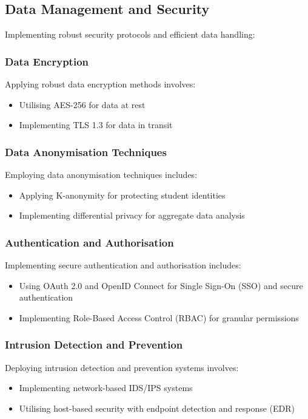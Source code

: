 \documentclass[15pt,a4paper]{article}
\begin{document}
\begin{multicols}{2}
\subsection{Data Management and Security}
Implementing robust security protocols and efficient data handling:
\subsubsection*{Data Encryption}
Applying robust data encryption methods \textit{\parencite[pp. 100-150]{Stallings2023}} involves:
\begin{itemize}
    \item Utilising AES-256 for data at rest
    \item Implementing TLS 1.3 for data in transit
\end{itemize}

\subsubsection*{Data Anonymisation Techniques}
Employing data anonymisation techniques \textit{\parencite[pp. 75-100]{ElEmamArbuckle2023}} includes:
\begin{itemize}
    \item Applying K-anonymity for protecting student identities
    \item Implementing differential privacy for aggregate data analysis
\end{itemize}

\subsubsection*{Authentication and Authorisation}
Implementing secure authentication and authorisation \textit{\parencite[pp. 80-120]{Josuttis2023}} includes:
\begin{itemize}
    \item Using OAuth 2.0 and OpenID Connect for Single Sign-On (SSO) and secure authentication
    \item Implementing Role-Based Access Control (RBAC) for granular permissions
\end{itemize}

\subsubsection*{Intrusion Detection and Prevention}
Deploying intrusion detection and prevention systems \textit{\parencite[pp. 200-250]{StallingsBrown2024}} involves:
\begin{itemize}
    \item Implementing network-based IDS/IPS systems
    \item Utilising host-based security with endpoint detection and response (EDR)
\end{itemize}


\end{multicols}
\end{document}

